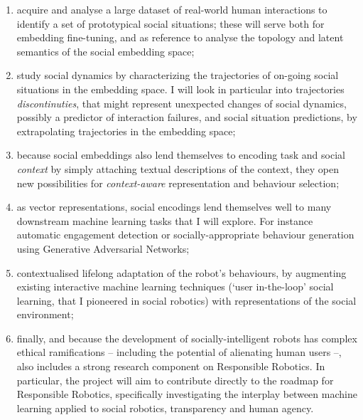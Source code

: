 \begin{enumerate}[label=\textbf{O\arabic*}]
    \item \label{T1} acquire and analyse a large dataset of real-world human
        interactions to identify a set of prototypical
        social situations; these will serve both for embedding fine-tuning, and
        as reference to analyse the topology and latent semantics of the social
        embedding space;

    \item \label{T2} study social dynamics by characterizing the trajectories of
        on-going social situations in the embedding space. I will look in
        particular into trajectories \emph{discontinuties}, that might represent
        unexpected changes of social dynamics, possibly a predictor of
        interaction failures, and social situation predictions, by extrapolating
        trajectories in the embedding space;

    \item \label{T5} because social embeddings also lend themselves to encoding
        task and social \emph{context} by simply attaching textual descriptions
        of the context, they open new possibilities for
        \emph{context-aware} representation and behaviour selection;


    \item \label{T3} as vector representations, social encodings lend
        themselves well to many downstream machine learning tasks
        that I will explore. For instance automatic engagement
        detection or socially-appropriate behaviour generation using Generative
        Adversarial Networks;

    \item \label{T4} contextualised lifelong adaptation of the robot's
        behaviours, by augmenting existing interactive machine learning
        techniques (`user in-the-loop' social learning, that I pioneered in
        social robotics\cite{senft2017supervised,
        winkle2020couch,winkle2021leador}) with representations of the social
        environment;

    \item \label{T6} finally, and because the development of
        socially-intelligent robots has complex ethical ramifications --
        including the potential of alienating human users --, \project also
        includes a strong research component on Responsible Robotics. In
        particular, the project will aim to contribute directly to the roadmap
        for Responsible Robotics, specifically investigating the interplay between
        machine learning applied to social robotics, transparency and human agency.

\end{enumerate}

